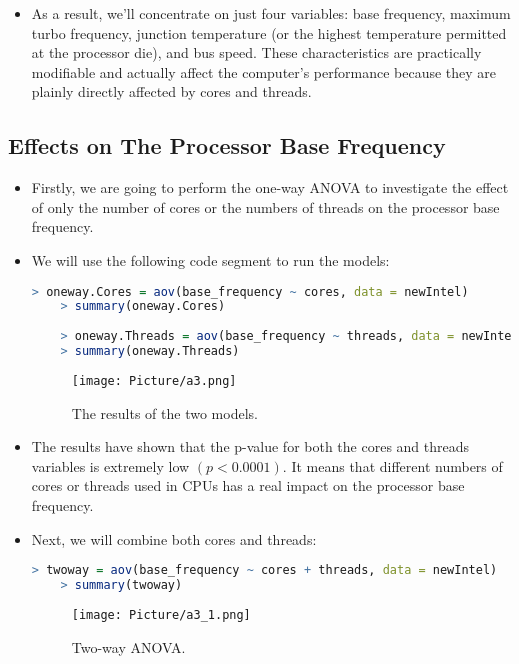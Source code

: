 \documentclass[a4paper]{article}
\begin{document}
\begin{itemize}
    \item[] As a result, we'll concentrate on just four variables: base frequency, maximum turbo frequency, junction temperature (or the highest temperature permitted at the processor die), and bus speed. These characteristics are practically modifiable and actually affect the computer's performance because they are plainly directly affected by cores and threads.
\end{itemize}

\subsection{Effects on The Processor Base Frequency}
\begin{itemize}
    \item[] Firstly, we are going to perform the one-way ANOVA to investigate the effect of only the number of cores or the numbers of threads on the processor base frequency.
    
    \item[] We will use the following code segment to run the models:
    \begin{lstlisting}[language=R]
    > oneway.Cores = aov(base_frequency ~ cores, data = newIntel)
    > summary(oneway.Cores)
    
    > oneway.Threads = aov(base_frequency ~ threads, data = newIntel)
    > summary(oneway.Threads)
    \end{lstlisting}
    
    \begin{figure}[H]
        \centering
        \texttt{[image: Picture/a3.png]}
        \caption{The results of the two models.}
        \label{7.1.1}
    \end{figure}
    
    \item[] The results have shown that the p-value for both the cores and threads variables is extremely low $(p < 0.0001)$. It means that different numbers of cores or threads used in CPUs has a real impact on the processor base frequency.
    
    \item[] Next, we will combine both cores and threads:
    \begin{lstlisting}[language=R]
    > twoway = aov(base_frequency ~ cores + threads, data = newIntel)
    > summary(twoway)
    \end{lstlisting}
    
    \begin{figure}[H]
        \centering
        \texttt{[image: Picture/a3\_1.png]}
        \caption{Two-way ANOVA.}
        \label{7.1.2}
    \end{figure}
    

\end{itemize}
\end{document}

